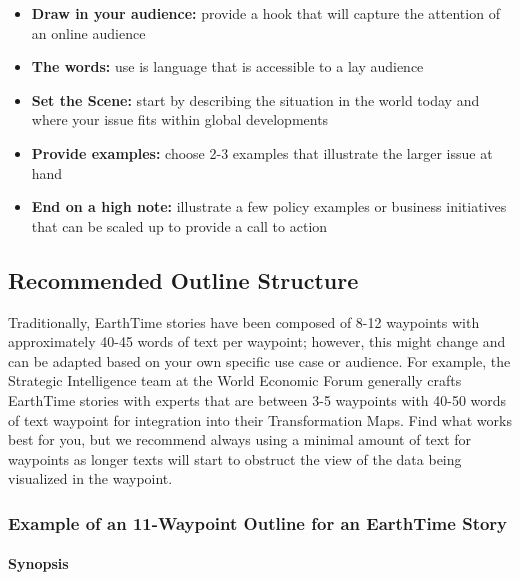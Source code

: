 \documentclass[
]{krantz}
\providecommand{\tightlist}{%
  \setlength{\itemsep}{0pt}\setlength{\parskip}{0pt}}
\begin{document}
\begin{itemize}
\tightlist
\item
  \textbf{Draw in your audience:} provide a hook that will capture the attention of an online audience
\item
  \textbf{The words:} use is language that is accessible to a lay audience
\item
  \textbf{Set the Scene:} start by describing the situation in the world today and where your issue fits within global developments
\item
  \textbf{Provide examples:} choose 2-3 examples that illustrate the larger issue at hand
\item
  \textbf{End on a high note:} illustrate a few policy examples or business initiatives that can be scaled up to provide a call to action
\end{itemize}

\hypertarget{recommended-outline-structure}{%
\subsection*{Recommended Outline Structure}\label{recommended-outline-structure}}


Traditionally, EarthTime stories have been composed of 8-12 waypoints with approximately 40-45 words of text per waypoint; however, this might change and can be adapted based on your own specific use case or audience. For example, the Strategic Intelligence team at the World Economic Forum generally crafts EarthTime stories with experts that are between 3-5 waypoints with 40-50 words of text waypoint for integration into their Transformation Maps. Find what works best for you, but we recommend always using a minimal amount of text for waypoints as longer texts will start to obstruct the view of the data being visualized in the waypoint.

\hypertarget{example-of-an-11-waypoint-outline-for-an-earthtime-story}{%
\subsubsection*{Example of an 11-Waypoint Outline for an EarthTime Story}\label{example-of-an-11-waypoint-outline-for-an-earthtime-story}}


\hypertarget{synopsis}{%
\paragraph*{Synopsis}\label{synopsis}}
\end{document}

